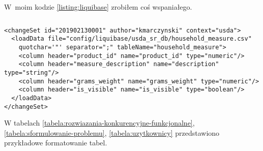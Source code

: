 W~moim kodzie \ref{listing:liquibase} zrobiłem coś wspaniałego. \lipsum[1]

\noindent\begin{minipage}{\textwidth}
    \begin{lstlisting}[caption={Skrpyt ładujący dane z~pliku CSV}, label={listing:liquibase}]
    \end{lstlisting}
    \hspace{.075\textwidth}\begin{minipage}{.85\textwidth}
    \begin{verbatim}
<changeSet id="201902130001" author="kmarczynski" context="usda">
  <loadData file="config/liquibase/usda_sr_db/household_measure.csv"
    quotchar='"' separator=";" tableName="household_measure">
    <column header="product_id" name="product_id" type="numeric"/>
    <column header="measure_description" name="description" type="string"/>
    <column header="grams_weight" name="grams_weight" type="numeric"/>
    <column header="is_visible" name="is_visible" type="boolean"/>
  </loadData>
</changeSet>
    \end{verbatim}
    \end{minipage}

    \raggedright\source{\ownwork}
    \vspace{0.75cm}
\end{minipage}

\lipsum[1]

W tabelach \ref{tabela:rozwiazania-konkurencyjne-funkcjonalne}, \ref{tabela:sformulowanie-problemu}, \ref{tabela:uzytkownicy} przedstawiono przykładowe formatowanie tabel.


